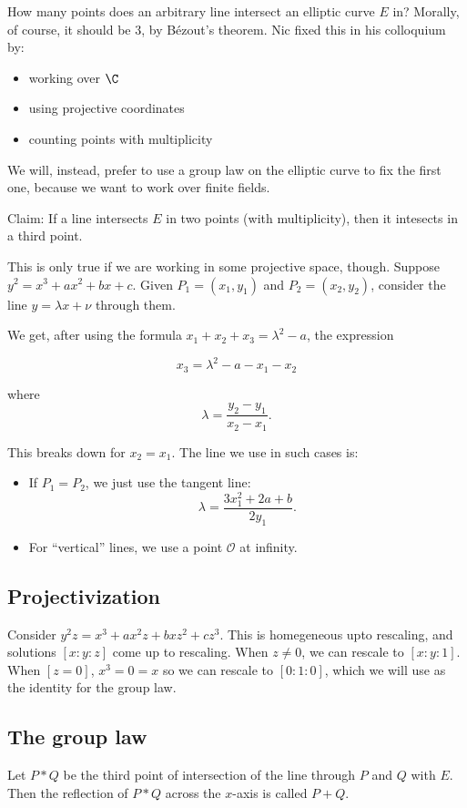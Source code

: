 \documentclass{article}
\begin{document}
How many points does an arbitrary line intersect an elliptic curve $E$ in?
Morally, of course, it should be $3$, by Bézout's theorem. Nic fixed this in his
colloquium by:
\begin{itemize}
\item working over $\C$
\item using projective coordinates
\item counting points with multiplicity
\end{itemize}

We will, instead, prefer to use a group law on the elliptic curve to fix the
first one, because we want to work over finite fields.

Claim: If a line intersects $E$ in two points (with multiplicity), then it
intesects in a third point.

This is only true if we are working in some projective space, though. Suppose
$y^2 = x^3+ax^2+bx+c$. Given $P_1=(x_1,y_1)$ and $P_2 = (x_2,y_2)$, consider the
line $y=\lambda x+\nu$ through them.

We get, after using the formula $x_1+x_2+x_3 = \lambda^2 - a$, the expression

$$x_3 = \lambda^2 - a - x_1 - x_2$$

where $$\lambda = \frac{y_2-y_1}{x_2-x_1}.$$

This breaks down for $x_2=x_1$. The line we use in such cases is:
\begin{itemize}
\item If $P_1=P_2$, we just use the tangent line:
  $$\lambda = \frac{3x_1^2+2a+b}{2y_1}.$$
\item For ``vertical'' lines, we use a point $\mathcal O$ at infinity.
\end{itemize}

\subsection{Projectivization}
Consider $y^2z = x^3+ax^2z+bxz^2+cz^3$. This is homegeneous upto rescaling, and
solutions $[x:y:z]$ come up to rescaling. When $z\neq 0$, we can rescale to
$[x:y:1]$. When $[z=0]$, $x^3 = 0 = x$ so we can rescale to $[0:1:0]$, which we
will use as the identity for the group law.

\subsection{The group law}
Let $P\ast Q$ be the third point of intersection of the line through $P$ and $Q$
with $E$. Then the reflection of $P\ast Q$ across the $x$-axis is called $P+Q$.
\end{document}
